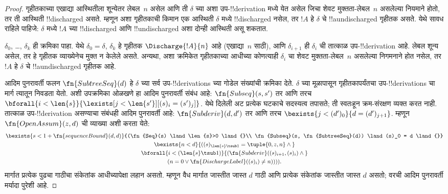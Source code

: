 \documentclass[../../../include/open-logic-section]{subfiles}
\begin{document}
\begin{proof}
  गृहीतकाच्या एखाद्या आस्थितीला शून्येतर लेबल~$n$ असेल आणि ती
  $\delta$ च्या अशा उप-!!{derivation} मध्ये येत असेल जिचा शेवट
  मुक्तता-लेबल~$n$ असलेल्या नियमाने होतो, तर ती आस्थिती
  !!{discharged} असते. म्हणून अशा गृहीतकाची किमान एक आस्थिती
  $\delta$ मध्ये !!{discharged} नसेल, तर $!A$ हे
  $\delta$ चे !!a{undischarged} गृहीतक असते. येथे सावध राहिले
  पाहिजे: $\delta$ मध्ये $!A$ च्या !!{discharged} आणि
  !!{undischarged} अशा दोन्ही आस्थिती असू शकतात.

  $\delta_0$, \dots, $\delta_k$ ही क्रमिका पाहा. येथे $\delta_0 =
  \delta$, $\delta_k$ हे गृहीतक $\Discharge{!A}{n}$ आहे
  (एखाद्या~$n$ साठी), आणि $\delta_{i+1}$ ही $\delta_i$ ची तात्काळ
  उप-!!{derivation} आहे. लेबल शून्य असेल, तर हे गृहीतक व्याख्येनेच
  मुक्त न केलेले असते. अन्यथा, अशा क्रमिकेत गृहीतकाच्या आधीच्या कोणत्याही
  $\delta_i$ चा शेवट मुक्तता-लेबल~$n$ असलेल्या निगमनाने होत नसेल,
  तर $!A$ हे $\delta$ चे !!a{undischarged} गृहीतक आहे.

  आदिम पुनरावर्ती फलन $\fn{SubtreeSeq}(d)$ हे $\delta$ च्या
  सर्व उप-!!{derivation}s च्या गोडेल संख्यांची क्रमिका देते.
  $\delta$ च्या मूळापासून गृहीतकापर्यंतचा उप-!!{derivation}s चा मार्ग त्यातून
  निवडता येतो. अशी उपक्रमिका ओळखणे हा आदिम पुनरावर्ती संबंध आहे:
  $\fn{Subseq}(s, s')$ तर आणि तरच
  $\bforall{i<\len{s}}{\lexists[j<\len{s'}][(s)_i = (s')_j]}$.
  येथे दिलेली अट प्रत्येक घटकाचे सदस्यत्व तपासते; ती स्वतःहून
  क्रम-संरक्षण व्यक्त करत नाही. तात्काळ उप-!!{derivation} असण्याचा
  संबंधही आदिम पुनरावर्ती आहे: $\fn{Subderiv}(d, d')$ तर आणि तरच
  $\bexists{j<(d')_0}{d = (d')_{j+1}}$. म्हणून
  $\fn{OpenAssum}(z, d)$ ची व्याख्या अशी करता येते:
  \begin{multline*}
    \bexists{s<1+\fn{sequenceBound}(d,d)}{(\fn{Seq}(s) \land \len{s}>0 \land {}\\
      \fn{Subseq}(s, \fn{SubtreeSeq}(d))
      \land (s)_0 = d \land {}} \\
    \bexists{n<d}{((s)_{\len{s} \tsub 1} = \tuple{0, z, n} \land {}}\\
      \bforall{i<(\len{s} \tsub 1)}{(\fn{Subderiv}((s)_{i+1}, (s)_i) \land {}}\\
      (n=0 \lor \fn{DischargeLabel}((s)_i) \neq n)))).
  \end{multline*}
मार्गात प्रत्येक पुढचा गाठीचा संकेतांक आधीच्यापेक्षा लहान असतो.
म्हणून वैध मार्गात जास्तीत जास्त $d$ गाठी आणि प्रत्येक संकेतांक
जास्तीत जास्त $d$ असतो; वरची आदिम पुनरावर्ती मर्यादा पुरेशी आहे.
\end{proof}
\end{document}
